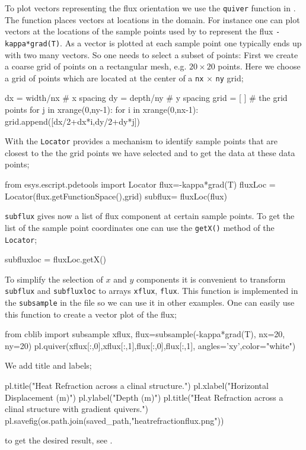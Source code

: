 To plot vectors representing the flux orientation we use the 
\verb|quiver| function in \pylab. The function places vectors at locations in the domain.
For instance one can plot vectors at the locations of the sample points used by \esc 
to represent the flux \verb|-kappa*grad(T)|. As a vector is plotted at each sample point one typically ends
up with two many vectors. So one needs to select a subset of points:
First we create a coarse grid of points on a rectangular mesh, e.g. $20 \times 20$ points. Here we choose a grid of points which are located at the center of a \verb|nx| $\times$ \verb|ny| grid;
\begin{python}
dx = width/nx # x spacing
dy = depth/ny # y spacing
grid = [ ] # the grid points
for j in xrange(0,ny-1):
    for i in xrange(0,nx-1):
           grid.append([dx/2+dx*i,dy/2+dy*j])
\end{python}
With the \verb|Locator| \esc provides a mechanism to identify sample points that are closest 
to the the grid points we have selected and to get the data at these data points; 
\begin{python}
from esys.escript.pdetools import Locator
flux=-kappa*grad(T)
fluxLoc = Locator(flux.getFunctionSpace(),grid)
subflux= fluxLoc(flux) 
\end{python}
\verb|subflux| gives now a list of flux component at certain sample points. To get the 
list of the sample point coordinates one can use the \verb|getX()| method of the 
\verb|Locator|;
\begin{python}
subfluxloc = fluxLoc.getX()
\end{python}
To simplify the selection of $x$ and $y$ components it is convenient 
to transform \verb|subflux| and \verb|subfluxloc| to \numpy arrays
\verb|xflux|, \verb|flux|.
This function is implemented in the \verb|subsample| 
in the   file so we can use it in other examples. One can easily use this function 
to create a vector plot of the flux;
\begin{python}
from cblib import subsample
xflux, flux=subsample(-kappa*grad(T), nx=20, ny=20)
pl.quiver(xflux[:,0],xflux[:,1],flux[:,0],flux[:,1], angles='xy',color="white")
\end{python}
We add title and labels;
\begin{python}
pl.title("Heat Refraction across a clinal structure.")
pl.xlabel("Horizontal Displacement (m)")
pl.ylabel("Depth (m)")
pl.title("Heat Refraction across a clinal structure \n with gradient quivers.")
pl.savefig(os.path.join(saved_path,"heatrefractionflux.png"))
\end{python} 
to get the desired result, see .


